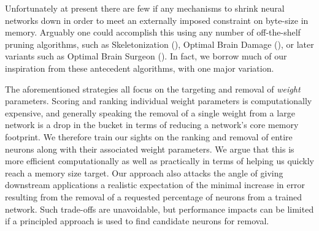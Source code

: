 Unfortunately at present there are few if any mechanisms to shrink neural networks down in order to meet an externally imposed constraint on byte-size in memory. Arguably one could accomplish this using any number of off-the-shelf pruning algorithms, such as Skeletonization (\cite{mozer1989skeletonization}), Optimal Brain Damage (\cite{lecun1989optimal}), or later variants such as Optimal Brain Surgeon (\cite{hassibi1993second}). In fact, we borrow much of our inspiration from these antecedent algorithms, with one major variation. 


The aforementioned strategies all focus on the targeting and removal of \textit{weight} parameters. Scoring and ranking individual weight parameters is computationally expensive, and generally speaking the removal of a single weight from a large network is a drop in the bucket in terms of reducing a network's core memory footprint. We therefore train our sights on the ranking and removal of entire neurons along with their associated weight parameters. We argue that this is more efficient computationally as well as practically in terms of helping us quickly reach a memory size target. Our approach also attacks the angle of giving downstream applications a realistic expectation of the minimal increase in error resulting from the removal of a requested percentage of neurons from a trained network. Such trade-offs are unavoidable, but performance impacts can be limited if a principled approach is used to find candidate neurons for removal. 


